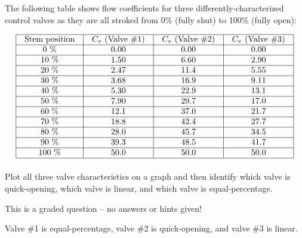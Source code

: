 

The following table shows flow coefficients for three differently-characterized control valves as they are all stroked from 0\% (fully shut) to 100\% (fully open):


$$\vbox{\offinterlineskip
\halign{\strut
\vrule \quad\hfil # \ \hfil & 
\vrule \quad\hfil # \ \hfil & 
\vrule \quad\hfil # \ \hfil & 
\vrule \quad\hfil # \ \hfil \vrule \cr
\noalign{\hrule}
%
Stem position & $C_v$ (Valve \#1) & $C_v$ (Valve \#2) & $C_v$ (Valve \#3) \cr
%
\noalign{\hrule}
%
0 \% & 0.00 & 0.00 & 0.00 \cr
%
\noalign{\hrule}
%
10 \% & 1.50 & 6.60 & 2.90 \cr
%
\noalign{\hrule}
%
20 \% & 2.47 & 11.4 & 5.55 \cr
%
\noalign{\hrule}
%
30 \% & 3.68 & 16.9 & 9.11 \cr
%
\noalign{\hrule}
%
40 \% & 5.30 & 22.9 & 13.1 \cr
%
\noalign{\hrule}
%
50 \% & 7.90 & 29.7 & 17.0 \cr
%
\noalign{\hrule}
%
60 \% & 12.1 & 37.0 & 21.7 \cr
%
\noalign{\hrule}
%
70 \% & 18.8 & 42.4 & 27.7 \cr
%
\noalign{\hrule}
%
80 \% & 28.0 & 45.7 & 34.5 \cr
%
\noalign{\hrule}
%
90 \% & 39.3 & 48.5 & 41.7 \cr
%
\noalign{\hrule}
%
100 \% & 50.0 & 50.0 & 50.0 \cr
%
\noalign{\hrule}
} %
}$$ %

Plot all three valve characteristics on a graph and then identify which valve is quick-opening, which valve is linear, and which valve is equal-percentage.

\vfil 

\eject






This is a graded question -- no answers or hints given!
 






Valve \#1 is equal-percentage, valve \#2 is quick-opening, and valve \#3 is linear.

